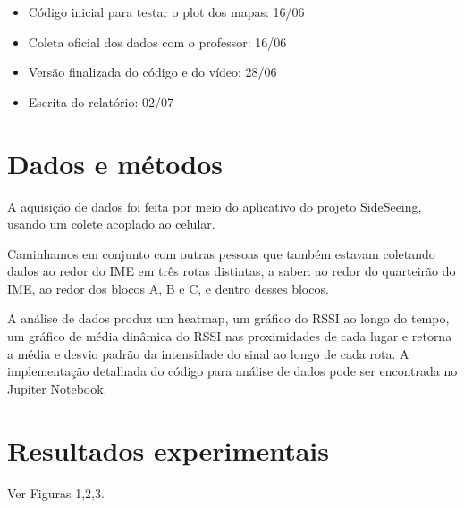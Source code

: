 \documentclass{article}
\begin{document}
\begin{itemize}
    \item Código inicial para testar o plot dos mapas: 16/06
    \item Coleta oficial dos dados com o professor: 16/06
    \item Versão finalizada do código e do vídeo: 28/06
    \item Escrita do relatório: 02/07
\end{itemize}

\section{Dados e métodos}
A aquisição de dados foi feita por meio do aplicativo do projeto SideSeeing, usando um colete acoplado ao celular.

Caminhamos em conjunto com outras pessoas que também estavam coletando dados ao redor do IME em três rotas distintas, a saber: ao redor do quarteirão do IME, ao redor dos blocos A, B e C, e dentro desses blocos.

A análise de dados produz um heatmap, um gráfico do RSSI ao longo do tempo, um gráfico de média dinâmica do RSSI nas proximidades de cada lugar e retorna a média e desvio padrão da intensidade do sinal ao longo de cada rota. A implementação detalhada do código para análise de dados pode ser encontrada no Jupiter Notebook.

\section{Resultados experimentais}
Ver Figuras 1,2,3.  
\end{document}
